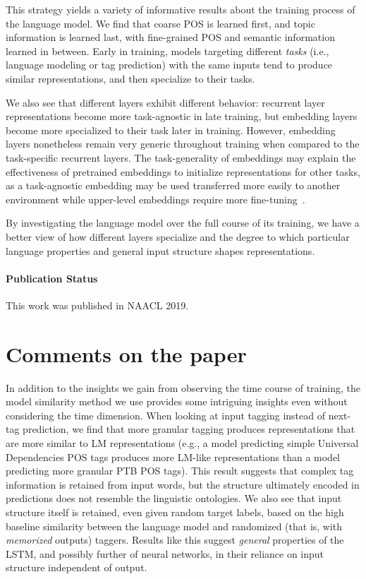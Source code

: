 This strategy yields a variety of informative results about the training process of the language model. We find that coarse POS is learned first, and topic information is learned last, with fine-grained POS and semantic information learned in between. Early in training, models targeting different \textit{tasks} (i.e., language modeling or tag prediction) with the same inputs tend to produce similar representations, and then specialize to their tasks. 

We also see that different layers exhibit different behavior: recurrent layer representations become more task-agnostic in late training, but embedding layers become more specialized to their task later in training. However, embedding layers nonetheless remain very generic throughout training when compared to the task-specific recurrent layers. The task-generality of embeddings may explain the effectiveness of pretrained embeddings to initialize representations for other tasks, as a task-agnostic embedding may be used transferred more easily to another environment while upper-level embeddings require more fine-tuning~\citep{howard_fine-tuned_2018}.

By investigating the language model over the full course of its training, we have a better view of how different layers specialize and the degree to which particular language properties and general input structure shapes representations.



\paragraph*{Publication Status } This work was published in NAACL 2019.




\section{Comments on the paper}

In addition to the insights we gain from observing the time course of training, the model similarity method we use provides some intriguing insights even without considering the time dimension. When looking at input tagging instead of next-tag prediction, we find that more granular tagging produces representations that are more similar to LM representations (e.g., a model predicting simple Universal Dependencies POS tags produces more LM-like representations than a model predicting more granular PTB POS tags). This result suggests that complex tag information is retained from input words, but the structure ultimately encoded in predictions does not resemble the linguistic ontologies. We also see that input structure itself is retained, even given random target labels, based on the high baseline similarity between the language model and randomized (that is, with \textit{memorized} outputs) taggers. Results like this suggest \textit{general} properties of the LSTM, and possibly further of neural networks, in their reliance on input structure independent of output.

